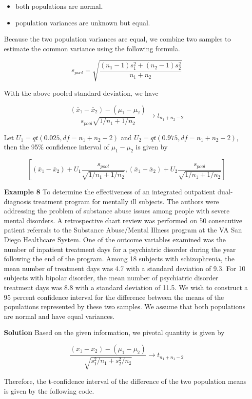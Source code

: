 \documentclass[
]{book}
\begin{document}
\begin{itemize}
\item
  both populations are normal.
\item
  population variances are unknown but equal.
\end{itemize}

Because the two population variances are equal, we combine two samples to estimate the common variance using the following formula.

\[
s_{pool} = \sqrt{\frac{(n_1-1)s_1^2 + (n_2-1)s_2^2}{n_1 + n_2} }
\]

With the above pooled standard deviation, we have

\[
\frac{(\bar{x}_1 - \bar{x}_2)-(\mu_{1} - \mu_{2}) }{s_{pool}\sqrt{1/n_1 + 1/n_2}} \to t_{n_1 + n_2 -2}
\]

Let \(U_1 = qt(0.025, df =n_1+n_2 -2)\) and \(U_2 = qt(0.975, df =n_1+n_2 -2)\), then the 95\% confidence interval of \(\mu_1 - \mu_2\) is given by

\[
\left[(\bar{x}_1 - \bar{x}_2)+U_1\frac{s_{pool}}{\sqrt{1/n_1 + 1/n_2}}, (\bar{x}_1 - \bar{x}_2)+U_2\frac{s_{pool}}{\sqrt{1/n_1 + 1/n_2}}\right]
\]

\textbf{Example 8} To determine the effectiveness of an integrated outpatient dual-diagnosis treatment program for mentally ill subjects. The authors were addressing the problem of substance abuse issues among people with severe mental disorders. A retrospective chart review was performed on 50 consecutive patient referrals to the Substance Abuse/Mental Illness program at the VA San Diego Healthcare System. One of the outcome variables examined was the number of inpatient treatment days for a psychiatric disorder during the year following the end of the program. Among 18 subjects with schizophrenia, the mean number of treatment days was 4.7 with a standard deviation of 9.3. For 10 subjects with bipolar disorder, the mean number of psychiatric disorder treatment days was 8.8 with a standard deviation of 11.5. We wish to construct a 95 percent confidence interval for the difference between the means of the populations represented by these two samples. We assume that both populations are normal and have equal variances.

\textbf{Solution} Based on the given information, we pivotal quantity is given by

\[
\frac{(\bar{x}_1 - \bar{x}_2)-(\mu_1-\mu_2)}{\sqrt{s_1^2/n_1 + s_2^2/n_2}} \to t_{n_1+n_1 - 2}
\]

Therefore, the t-confidence interval of the difference of the two population means is given by the following code.
\end{document}
